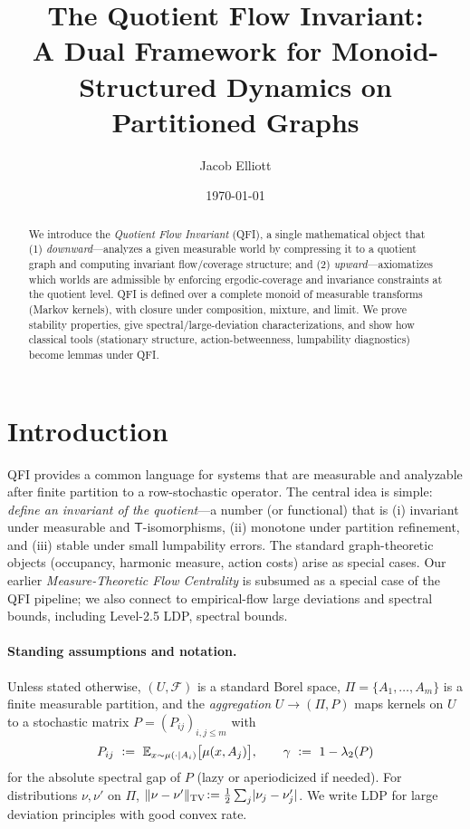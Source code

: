 \documentclass[11pt]{article}
\title{The Quotient Flow Invariant:\\
A Dual Framework for Monoid-Structured Dynamics on Partitioned Graphs}
\author{Jacob Elliott}
\date{\today}
\newcommand{\EE}{\mathbb{E}}
\newcommand{\TV}{\mathrm{TV}}
\newcommand{\gap}{\gamma}             %
\newcommand{\1}{\mathbf{1}}
\newcommand{\defeq}{\vcentcolon=}     %
\DeclarePairedDelimiter{\norm}{\lVert}{\rVert}
\DeclarePairedDelimiter{\abs}{\lvert}{\rvert}
\begin{document}
\maketitle

\begin{abstract}
We introduce the \emph{Quotient Flow Invariant} (QFI), a single mathematical object that
(1) \emph{downward}—analyzes a given measurable world by compressing it to a quotient graph and computing invariant flow/coverage structure; and
(2) \emph{upward}—axiomatizes which worlds are admissible by enforcing ergodic-coverage and invariance constraints at the quotient level.
QFI is defined over a complete monoid of measurable transforms (Markov kernels)\cite{Kallenberg2002}, with closure under composition, mixture, and limit.
We prove stability properties, give spectral/large-deviation characterizations\cite{Chung1997,DemboZeitouni1998}, and show how classical tools (stationary structure, action-betweenness, lumpability diagnostics) become lemmas under QFI.
\end{abstract}

\section{Introduction}
QFI provides a common language for systems that are measurable and analyzable after finite partition to a row-stochastic operator\cite{LevinPeresWilmer2017,Kallenberg2002}.
The central idea is simple: \emph{define an invariant of the quotient}—a number (or functional) that is (i) invariant under measurable and $\mathsf T$-isomorphisms, (ii) monotone under partition refinement, and (iii) stable under small lumpability errors\cite{KemenySnell1960,Buchholz1994}.
The standard graph-theoretic objects (occupancy, harmonic measure\cite{DoyleSnell1984}, action costs) arise as special cases.
Our earlier \emph{Measure-Theoretic Flow Centrality}\cite{ElliottMTFC2025} is subsumed as a special case of the QFI pipeline; we also connect to empirical-flow large deviations and spectral bounds, including Level-2.5 LDP, spectral bounds\cite{BertiniFaggionatoGabrielli2015,DemboZeitouni1998,Chung1997,DonskerVaradhan1975I}. %

\paragraph{Standing assumptions and notation.}
Unless stated otherwise, $(U,\mathcal F)$ is a standard Borel space\cite{Kallenberg2002,Billingsley,Durrett}, $\Pi=\{A_1,\dots,A_m\}$ is a finite measurable partition, and the \emph{aggregation} $U\to(\Pi,P)$ maps kernels on $U$ to a stochastic matrix $P=(P_{ij})_{i,j\le m}$ with
\[
P_{ij}\ \defeq\ \EE_{x\sim \mu(\cdot\mid A_i)}\big[\mu(x,A_j)\big],\qquad
\gap\ \defeq\ 1-\lambda_2(P)
\]
for the absolute spectral gap of $P$ (lazy or aperiodicized if needed\cite{Chung1997}).
For distributions $\nu,\nu'$ on $\Pi$, $\norm{\nu-\nu'}_{\TV}\!\defeq \tfrac12\sum_j \abs{\nu_j-\nu'_j}$.
We write $\mathrm{LDP}$ for large deviation principles with good convex rate\cite{DemboZeitouni1998}.
\end{document}
